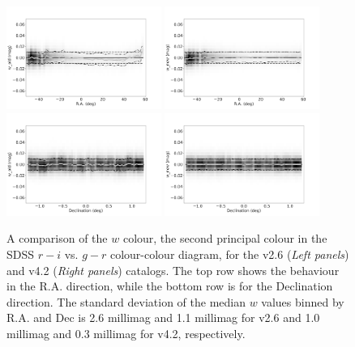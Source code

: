 \documentclass[fleqn,usenatbib]{mnras}
\begin{document}
\begin{figure}
    \centering\includegraphics[width=0.45\textwidth]{figures/testV26vsV42_r_w_old_RA_Hess_lr.png}
    \centering\includegraphics[width=0.45\textwidth]{figures/testV26vsV42_r_w_new_RA_Hess_lr.png}
    \centering\includegraphics[width=0.45\textwidth]{figures/testV26vsV42_r_w_old_Dec_Hess_lr.png}
    \centering\includegraphics[width=0.45\textwidth]{figures/testV26vsV42_r_w_new_Dec_Hess_lr.png}
\caption{A comparison of the $w$ colour, the second principal colour in the SDSS
$r-i$ vs. $g-r$ colour-colour diagram, for the v2.6 ({\it Left panels}) and v4.2 ({\it Right panels})
catalogs. The top row shows the behaviour in the R.A. direction, while the bottom row is for the Declination direction. The standard deviation of the median $w$ values binned by R.A. and Dec
is 2.6 millimag and 1.1 millimag for v2.6 and 1.0 millimag and 0.3 millimag for v4.2,
respectively.}
\label{fig:comparew} 
\end{figure}
 
\end{document}
